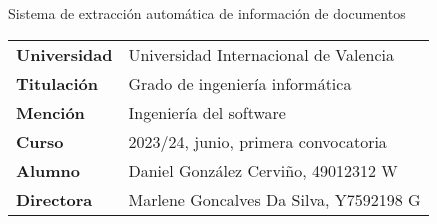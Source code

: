 \noindent
\normalfont\normalsize
Sistema de extracción automática de información de documentos
\vspace{1em}
\begin{table}[h]
    \renewcommand{\arraystretch}{1.5} %
    \begin{tabular}{p{} p{}}
        \textbf{Universidad} & Universidad Internacional de Valencia  \\
        \textbf{Titulación}  & Grado de ingeniería informática        \\
        \textbf{Mención}     & Ingeniería del software                \\
        \textbf{Curso}       & 2023/24, junio, primera convocatoria   \\
        \textbf{Alumno}      & Daniel González Cerviño, 49012312 W    \\
        \textbf{Directora}   & Marlene Goncalves Da Silva, Y7592198 G \\
    \end{tabular}
    \label{tab:}
\end{table}
